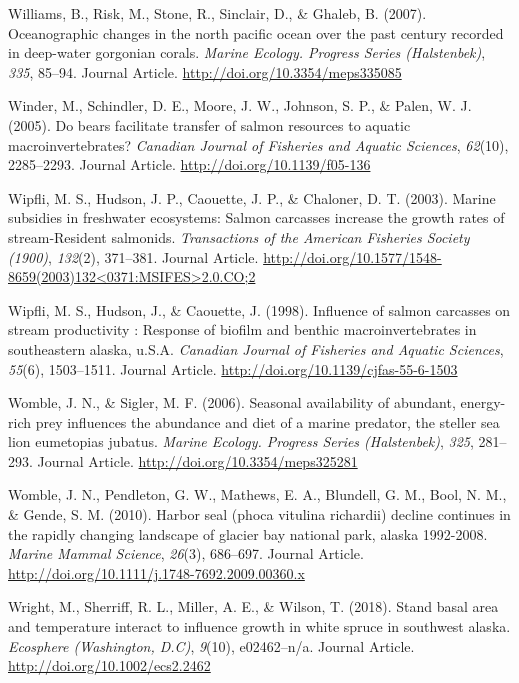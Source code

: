 \documentclass [11pt, proquest] {uwthesis}[2015/03/03]
\begin{document}
\hypertarget{ref-Williams2007}{}
Williams, B., Risk, M., Stone, R., Sinclair, D., \& Ghaleb, B. (2007).
Oceanographic changes in the north pacific ocean over the past century
recorded in deep-water gorgonian corals. \emph{Marine Ecology. Progress
Series (Halstenbek)}, \emph{335}, 85--94. Journal Article.
\url{http://doi.org/10.3354/meps335085}

\hypertarget{ref-Winder2005}{}
Winder, M., Schindler, D. E., Moore, J. W., Johnson, S. P., \& Palen, W.
J. (2005). Do bears facilitate transfer of salmon resources to aquatic
macroinvertebrates? \emph{Canadian Journal of Fisheries and Aquatic
Sciences}, \emph{62}(10), 2285--2293. Journal Article.
\url{http://doi.org/10.1139/f05-136}

\hypertarget{ref-Wipfli2003}{}
Wipfli, M. S., Hudson, J. P., Caouette, J. P., \& Chaloner, D. T.
(2003). Marine subsidies in freshwater ecosystems: Salmon carcasses
increase the growth rates of stream‐Resident salmonids.
\emph{Transactions of the American Fisheries Society (1900)},
\emph{132}(2), 371--381. Journal Article.
\href{http://doi.org/10.1577/1548-8659(2003)132\%3C0371:MSIFES\%3E2.0.CO;2}{http://doi.org/10.1577/1548-8659(2003)132\textless{}0371:MSIFES\textgreater{}2.0.CO;2}

\hypertarget{ref-Wipfli1998}{}
Wipfli, M. S., Hudson, J., \& Caouette, J. (1998). Influence of salmon
carcasses on stream productivity : Response of biofilm and benthic
macroinvertebrates in southeastern alaska, u.S.A. \emph{Canadian Journal
of Fisheries and Aquatic Sciences}, \emph{55}(6), 1503--1511. Journal
Article. \url{http://doi.org/10.1139/cjfas-55-6-1503}

\hypertarget{ref-Womble2006}{}
Womble, J. N., \& Sigler, M. F. (2006). Seasonal availability of
abundant, energy-rich prey influences the abundance and diet of a marine
predator, the steller sea lion eumetopias jubatus. \emph{Marine Ecology.
Progress Series (Halstenbek)}, \emph{325}, 281--293. Journal Article.
\url{http://doi.org/10.3354/meps325281}

\hypertarget{ref-Womble2010}{}
Womble, J. N., Pendleton, G. W., Mathews, E. A., Blundell, G. M., Bool,
N. M., \& Gende, S. M. (2010). Harbor seal (phoca vitulina richardii)
decline continues in the rapidly changing landscape of glacier bay
national park, alaska 1992-2008. \emph{Marine Mammal Science},
\emph{26}(3), 686--697. Journal Article.
\url{http://doi.org/10.1111/j.1748-7692.2009.00360.x}

\hypertarget{ref-Wright2018}{}
Wright, M., Sherriff, R. L., Miller, A. E., \& Wilson, T. (2018). Stand
basal area and temperature interact to influence growth in white spruce
in southwest alaska. \emph{Ecosphere (Washington, D.C)}, \emph{9}(10),
e02462--n/a. Journal Article. \url{http://doi.org/10.1002/ecs2.2462}
\end{document}
